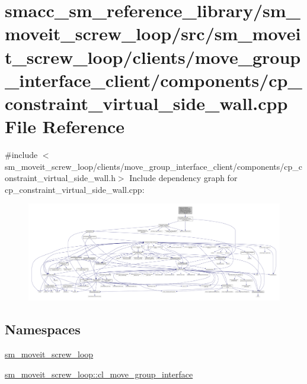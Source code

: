 \hypertarget{sm__moveit__screw__loop_2src_2sm__moveit__screw__loop_2clients_2move__group__interface__client_2a3472d57b7c80fd3d682cbf99319b4d5}{}\section{smacc\+\_\+sm\+\_\+reference\+\_\+library/sm\+\_\+moveit\+\_\+screw\+\_\+loop/src/sm\+\_\+moveit\+\_\+screw\+\_\+loop/clients/move\+\_\+group\+\_\+interface\+\_\+client/components/cp\+\_\+constraint\+\_\+virtual\+\_\+side\+\_\+wall.cpp File Reference}
\label{sm__moveit__screw__loop_2src_2sm__moveit__screw__loop_2clients_2move__group__interface__client_2a3472d57b7c80fd3d682cbf99319b4d5}
{\ttfamily \#include $<$sm\+\_\+moveit\+\_\+screw\+\_\+loop/clients/move\+\_\+group\+\_\+interface\+\_\+client/components/cp\+\_\+constraint\+\_\+virtual\+\_\+side\+\_\+wall.\+h$>$}\newline
Include dependency graph for cp\+\_\+constraint\+\_\+virtual\+\_\+side\+\_\+wall.\+cpp\+:
\nopagebreak
\begin{figure}[H]
\begin{center}
\leavevmode
\includegraphics[width=350pt]{sm__moveit__screw__loop_2src_2sm__moveit__screw__loop_2clients_2move__group__interface__client_26f9cce925ed558ce641f81ea44b2f626}
\end{center}
\end{figure}
\subsection*{Namespaces}
\begin{DoxyCompactItemize}
\item 
 \hyperlink{namespacesm__moveit__screw__loop}{sm\+\_\+moveit\+\_\+screw\+\_\+loop}
\item 
 \hyperlink{namespacesm__moveit__screw__loop_1_1cl__move__group__interface}{sm\+\_\+moveit\+\_\+screw\+\_\+loop\+::cl\+\_\+move\+\_\+group\+\_\+interface}
\end{DoxyCompactItemize}
